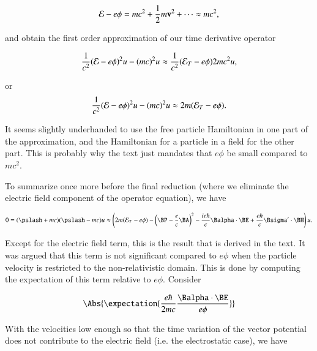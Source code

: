 \begin{equation}\label{eqn:diracGauge:440}
\mathcal{E} - e \phi = m c^2 + \frac{1}{2} m \mathbf{v}^2 + \cdots \approx m c^2,
\end{equation}

and obtain the first order approximation of our time derivative operator

\begin{equation}\label{eqn:diracGauge:460}
\frac{1}{c^2} ( \mathcal{E} - e \phi )^2 u - (m c)^2 u
\approx
\frac{1}{c^2} ( \mathcal{E}_{T} - e \phi ) 2 m c^2 u,
\end{equation}

or
\begin{equation}\label{eqn:diracGauge:480}
\frac{1}{c^2} ( \mathcal{E} - e \phi )^2 u - (m c)^2 u
\approx
2 m ( \mathcal{E}_{T} - e \phi ).
\end{equation}

It seems slightly underhanded to use the free particle Hamiltonian in one part of the approximation, and the Hamiltonian for a particle in a field for the other part.  This is probably why the text just mandates that $e\phi$ be small compared to $m c^2$.

To summarize once more before the final reduction (where we eliminate the electric field component of the operator equation), we have

\begin{equation}\label{eqn:diracGauge:400b}
0
=
(\pslash + mc)(\pslash - mc) u
\approx
\left(
2 m ( \mathcal{E}_{T} - e \phi )
- \left(\BP - \frac{e}{c} \BA \right)^2
- \frac{i e \hbar}{c} \Balpha \cdot \BE
+ \frac{e \hbar}{c} \Bsigma' \cdot \BH
\right) u.
\end{equation}

Except for the electric field term, this is the result that is derived in the text.  It was argued that this term is not significant compared to $e \phi$ when the particle velocity is restricted to the non-relativistic domain.  This is done by computing the expectation of this term relative to $e \phi$.  Consider

\begin{equation}\label{eqn:diracGauge:500}
\Abs{ \expectation{ \frac{e \hbar}{ 2 m c} \frac{\Balpha \cdot \BE}{e \phi } } }
\end{equation}

With the velocities low enough so that the time variation of the vector potential does not contribute to the electric field (i.e. the electrostatic case), we have

